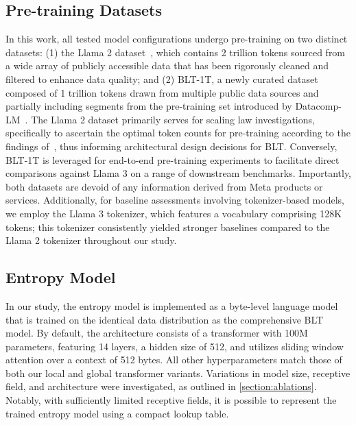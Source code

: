 \subsection{Pre-training Datasets} In this work, all tested model configurations undergo pre-training on two distinct datasets: (1) the Llama 2 dataset~\citep{touvron2023llama}, which contains 2 trillion tokens sourced from a wide array of publicly accessible data that has been rigorously cleaned and filtered to enhance data quality; and (2) {\textsc BLT}-1T, a newly curated dataset composed of 1 trillion tokens drawn from multiple public data sources and partially including segments from the pre-training set introduced by Datacomp-LM~\citep{li2024datacomp}. The Llama 2 dataset primarily serves for scaling law investigations, specifically to ascertain the optimal token counts for pre-training according to the findings of~\cite{dubey2024llama}, thus informing architectural design decisions for {\textsc BLT}. Conversely, {\textsc BLT}-1T is leveraged for end-to-end pre-training experiments to facilitate direct comparisons against Llama 3 on a range of downstream benchmarks. Importantly, both datasets are devoid of any information derived from Meta products or services. Additionally, for baseline assessments involving tokenizer-based models, we employ the Llama 3 tokenizer, which features a vocabulary comprising 128K tokens; this tokenizer consistently yielded stronger baselines compared to the Llama 2 tokenizer throughout our study.

\subsection{Entropy Model} In our study, the entropy model is implemented as a byte-level language model that is trained on the identical data distribution as the comprehensive {\textsc BLT} model. By default, the architecture consists of a transformer with 100M parameters, featuring 14 layers, a hidden size of 512, and utilizes sliding window attention over a context of 512 bytes. All other hyperparameters match those of both our local and global transformer variants. Variations in model size, receptive field, and architecture were investigated, as outlined in \autoref{section:ablations}. Notably, with sufficiently limited receptive fields, it is possible to represent the trained entropy model using a compact lookup table.

